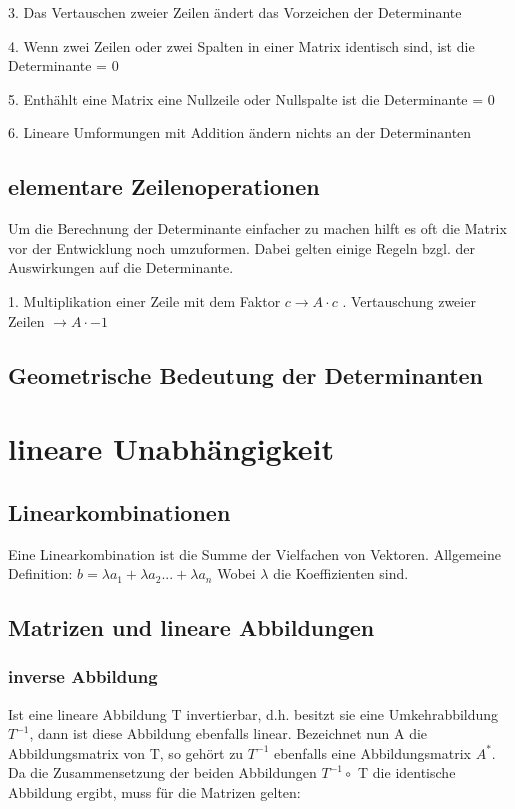 \documentclass[11pt,a4paper,onecolumn]{scrartcl}
\begin{document}
\begin{flushleft}
3. Das Vertauschen zweier Zeilen ändert das Vorzeichen der Determinante\linebreak

4. Wenn zwei Zeilen oder zwei Spalten in einer Matrix identisch sind, ist die Determinante = 0\linebreak

5. Enthählt eine Matrix eine Nullzeile oder Nullspalte ist die Determinante = 0\linebreak

6. Lineare Umformungen mit Addition ändern nichts an der Determinanten \linebreak

\subsection{elementare Zeilenoperationen}
Um die Berechnung der Determinante einfacher zu machen hilft es oft die Matrix vor der Entwicklung noch umzuformen. Dabei gelten einige Regeln bzgl. der Auswirkungen auf die Determinante.\linebreak

1. Multiplikation einer Zeile mit dem Faktor $ c \rightarrow A\cdot c$ . Vertauschung zweier Zeilen $ \rightarrow A\cdot-1 $\linebreak


\subsection{Geometrische Bedeutung der Determinanten}


\section{lineare Unabhängigkeit}
\subsection{Linearkombinationen}
Eine Linearkombination ist die Summe der Vielfachen von Vektoren. Allgemeine Definition: \linebreak
$ b = \lambda a_{1} + \lambda a_{2} ... + \lambda a_{n} $
Wobei $\lambda$ die Koeffizienten sind.

\subsection{Matrizen und lineare Abbildungen}
\subsubsection{inverse Abbildung}
Ist eine lineare Abbildung T invertierbar, d.h. besitzt sie eine Umkehrabbildung $ T^{-1} $, dann ist diese Abbildung ebenfalls linear.
Bezeichnet nun A die Abbildungsmatrix von T, so gehört zu $ T^{-1} $ ebenfalls eine Abbildungsmatrix $ A^{*} $. Da die Zusammensetzung der beiden Abbildungen $ T^{-1} \circ $ T die identische Abbildung ergibt, muss für die Matrizen gelten:\linebreak




\end{flushleft}
\end{document}
